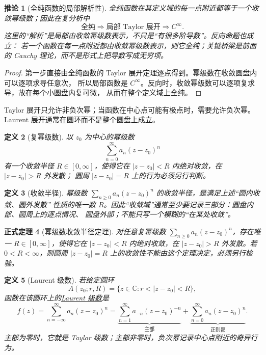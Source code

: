 \documentclass[UTF8,fontset=none,a4paper,11pt]{ctexart}
\theoremstyle{foundation-definition}
\newtheorem{definition}{定义}[section]
\theoremstyle{foundation-theorem}
\newtheorem{theorem}[definition]{正式定理}
\theoremstyle{foundation-proposition}
\theoremstyle{foundation-example}
\theoremstyle{foundation-remark}
\theoremstyle{foundation-theorem}
\newtheorem{corollary}[definition]{推论}
\newcommand{\term}[2]{\hyperref[#1]{#2}}
\begin{document}
\begin{corollary}[全纯函数的局部解析性]\label{cor:holomorphic-analytic}
全纯函数在其定义域的每一点附近都等于一个收敛幂级数；因此在复分析中
\[
\text{全纯}\Longrightarrow\text{局部 Taylor 展开}\Longrightarrow C^\infty.
\]
这里的“解析”是局部由收敛幂级数表示，不只是“有很多阶导数”。反向命题也成立：
若一个函数在每一点附近都由收敛幂级数表示，则它全纯；关键桥梁是前面的 Cauchy
理论，而不是形式上把导数写成无穷项。
\end{corollary}

\begin{proof}
第一步直接由全纯函数的 Taylor 展开定理逐点得到。幂级数在收敛圆盘内可以逐项求导任意次，
所以局部函数是 \(C^\infty\)。反向时，收敛幂级数可以逐项复求导，故在每个小圆盘内复可微，
从而在整个定义域上全纯。
\end{proof}

Taylor 展开只允许非负次幂；当函数在中心点可能有极点时，需要允许负次幂。Laurent 展开通常在圆环而不是整个圆盘上成立。

\begin{definition}[复幂级数]\label{def:power-series}
以 \(z_0\) 为中心的幂级数
\[
\sum_{n=0}^{\infty}a_n(z-z_0)^n
\]
有一个收敛半径 \(R\in[0,\infty]\)，使得它在
\(|z-z_0|<R\) 内绝对收敛，在 \(|z-z_0|>R\) 外发散；
圆周 \(|z-z_0|=R\) 上的行为必须另行判断。
\end{definition}

\begin{definition}[收敛半径]\label{def:convergence-radius}
幂级数 \(\sum_{n\ge0}a_n(z-z_0)^n\) 的收敛半径，是满足上述“圆内收敛、圆外发散”
性质的唯一数 \(R\)。因此“收敛域”通常至少要记录三部分：圆盘内部、圆周上的逐点情况、
圆盘外部；不能只写一个模糊的“在某处收敛”。
\end{definition}

\begin{theorem}[幂级数收敛半径定理]\label{thm:power-series-radius}
对任意复幂级数 \(\sum_{n\ge0}a_n(z-z_0)^n\)，存在唯一
\(R\in[0,\infty]\)，使得它在 \(|z-z_0|<R\) 内绝对收敛，在
\(|z-z_0|>R\) 外发散。若 \(0<R<\infty\)，则圆周
\(|z-z_0|=R\) 上的收敛性不能由这个定理决定，必须另行检验。
\end{theorem}

\begin{definition}[Laurent 级数]\label{def:laurent-series}
若给定圆环
\[
A(z_0;r,R)=\{z\in\mathbb C:r<|z-z_0|<R\},
\]
函数在该圆环上的\term{def:laurent-series}{Laurent 级数}是
\[
f(z)=\sum_{n=-\infty}^{\infty}a_n(z-z_0)^n
=\underbrace{\sum_{n=1}^{\infty}a_{-n}(z-z_0)^{-n}}_{\text{主部}}
+\underbrace{\sum_{n=0}^{\infty}a_n(z-z_0)^n}_{\text{正则部}}.
\]
主部为零时，它就是 Taylor 级数；主部非零时，负次幂记录中心点附近的奇异行为。
\end{definition}
\end{document}
